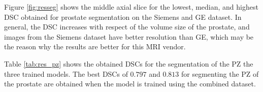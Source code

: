 Figure \ref{fig:resseg} shows the middle axial slice for the lowest, median, and highest DSC obtained for prostate segmentation on the Siemens and GE dataset. In general, the DSC increases with respect of the volume size of the prostate, and images from the Siemens dataset have better resolution than GE, which may be the reason why the results are better for this MRI vendor. 

Table \ref{tab:res_pz} shows the obtained DSCs for the segmentation of the PZ the three trained models.  The best DSCs of $0.797$ and $0.813$ for segmenting the PZ of the prostate are obtained when the model is trained using the combined dataset.  

